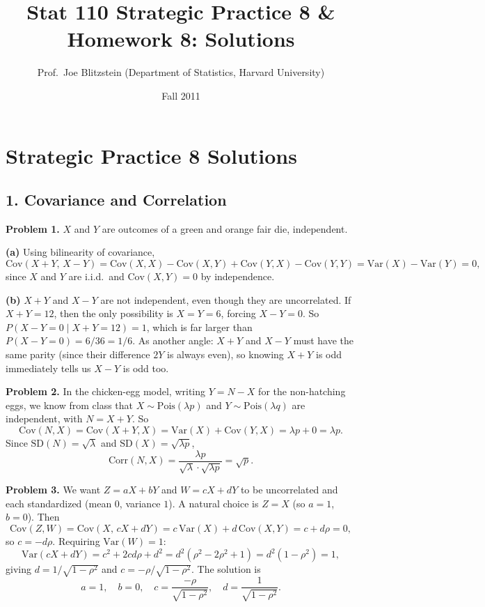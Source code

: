 \documentclass{article}
\title{Stat 110 Strategic Practice 8 \& Homework 8: Solutions}
\author{Prof.\ Joe Blitzstein (Department of Statistics, Harvard University)}
\date{Fall 2011}
\begin{document}
\maketitle

\section*{Strategic Practice 8 Solutions}

\subsection*{1. Covariance and Correlation}

\textbf{Problem 1.} $X$ and $Y$ are outcomes of a green and orange fair die, independent.

\textbf{(a)} Using bilinearity of covariance,
$$
\text{Cov}(X+Y,\, X-Y) = \text{Cov}(X,X) - \text{Cov}(X,Y) + \text{Cov}(Y,X) - \text{Cov}(Y,Y) = \text{Var}(X) - \text{Var}(Y) = 0,
$$
since $X$ and $Y$ are i.i.d.\ and $\text{Cov}(X,Y)=0$ by independence.

\textbf{(b)} $X+Y$ and $X-Y$ are not independent, even though they are uncorrelated. If $X+Y=12$, then the only possibility is $X=Y=6$, forcing $X-Y=0$. So $P(X-Y=0 \mid X+Y=12)=1$, which is far larger than $P(X-Y=0)=6/36=1/6$. As another angle: $X+Y$ and $X-Y$ must have the same parity (since their difference $2Y$ is always even), so knowing $X+Y$ is odd immediately tells us $X-Y$ is odd too.

\bigskip
\textbf{Problem 2.} In the chicken-egg model, writing $Y=N-X$ for the non-hatching eggs, we know from class that $X\sim\text{Pois}(\lambda p)$ and $Y\sim\text{Pois}(\lambda q)$ are independent, with $N=X+Y$. So
$$
\text{Cov}(N,X) = \text{Cov}(X+Y,X) = \text{Var}(X) + \text{Cov}(Y,X) = \lambda p + 0 = \lambda p.
$$
Since $\text{SD}(N)=\sqrt{\lambda}$ and $\text{SD}(X)=\sqrt{\lambda p}$,
$$
\text{Corr}(N,X) = \frac{\lambda p}{\sqrt{\lambda}\cdot\sqrt{\lambda p}} = \sqrt{p}.
$$

\bigskip
\textbf{Problem 3.} We want $Z=aX+bY$ and $W=cX+dY$ to be uncorrelated and each standardized (mean $0$, variance $1$). A natural choice is $Z=X$ (so $a=1$, $b=0$). Then
$$
\text{Cov}(Z,W) = \text{Cov}(X,\, cX+dY) = c\,\text{Var}(X) + d\,\text{Cov}(X,Y) = c + d\rho = 0,
$$
so $c = -d\rho$. Requiring $\text{Var}(W)=1$:
$$
\text{Var}(cX+dY) = c^2 + 2cd\rho + d^2 = d^2(\rho^2 - 2\rho^2 + 1) = d^2(1-\rho^2) = 1,
$$
giving $d = 1/\sqrt{1-\rho^2}$ and $c = -\rho/\sqrt{1-\rho^2}$. The solution is
$$
a=1,\quad b=0,\quad c=\frac{-\rho}{\sqrt{1-\rho^2}},\quad d=\frac{1}{\sqrt{1-\rho^2}}.
$$
\end{document}
